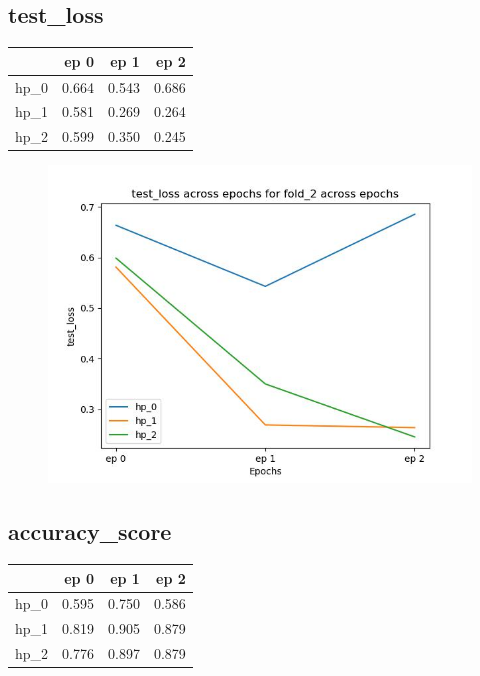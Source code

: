 \documentclass{article}
\begin{document}
\subsection{test\_loss}
\begin{tabular}{lrrr}
\toprule
{} &   ep 0 &   ep 1 &   ep 2 \\
\midrule
hp\_0 &  0.664 &  0.543 &  0.686 \\
hp\_1 &  0.581 &  0.269 &  0.264 \\
hp\_2 &  0.599 &  0.350 &  0.245 \\
\bottomrule
\end{tabular}

\begin{figure}[H]
\includegraphics[scale = 0.75]{fold_2/test_loss}
\end{figure}
\subsection{accuracy\_score}
\begin{tabular}{lrrr}
\toprule
{} &   ep 0 &   ep 1 &   ep 2 \\
\midrule
hp\_0 &  0.595 &  0.750 &  0.586 \\
hp\_1 &  0.819 &  0.905 &  0.879 \\
hp\_2 &  0.776 &  0.897 &  0.879 \\
\bottomrule
\end{tabular}
\end{document}
